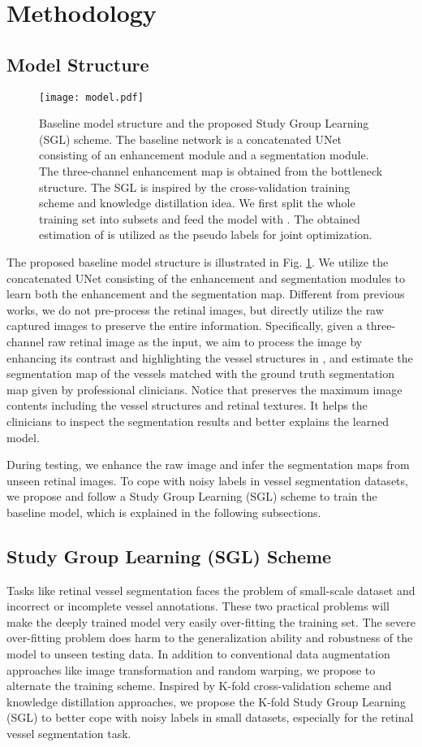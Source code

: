 \documentclass[runningheads]{llncs}
\begin{document}
\section{Methodology}
\subsection{Model Structure}
\begin{figure}[t]\centering
\texttt{[image: model.pdf]}
\caption{Baseline model structure and the proposed Study Group Learning (SGL) scheme. The baseline network is a concatenated UNet consisting of an enhancement module and a segmentation module. The three-channel enhancement map  is obtained from the bottleneck structure. The SGL is inspired by the cross-validation training scheme and knowledge distillation idea. We first split the whole training set  into  subsets  and feed the model  with . The obtained estimation  of  is utilized as the pseudo labels for joint optimization.}
\label{fig:model}
\end{figure}
The proposed baseline model structure is illustrated in Fig. \ref{fig:model}. We utilize the concatenated UNet consisting of the enhancement and segmentation modules to learn both the enhancement and the segmentation map. Different from previous works, we do not pre-process the retinal images, but directly utilize the raw captured images to preserve the entire information. Specifically, given a three-channel raw retinal image  as the input, we aim to process the image by enhancing its contrast and highlighting the vessel structures in , and estimate the segmentation map  of the vessels matched with the ground truth segmentation map  given by professional clinicians. Notice that  preserves the maximum image contents including the vessel structures and retinal textures. It helps the clinicians to inspect the segmentation results  and better explains the learned model. 

During testing, we enhance the raw image and infer the segmentation maps from unseen retinal images. To cope with noisy labels in vessel segmentation datasets, we propose and follow a Study Group Learning (SGL) scheme to train the baseline model, which is explained in the following subsections. 

\subsection{Study Group Learning (SGL) Scheme}
Tasks like retinal vessel segmentation faces the problem of small-scale dataset and incorrect or incomplete vessel annotations. These two practical problems will make the deeply trained model very easily over-fitting the training set. The severe over-fitting problem does harm to the generalization ability and robustness of the model to unseen testing data. In addition to conventional data augmentation approaches like image transformation and random warping, we propose to alternate the training scheme. Inspired by K-fold cross-validation scheme and knowledge distillation \cite{hinton2015distilling} approaches, we propose the K-fold Study Group Learning (SGL) to better cope with noisy labels in small datasets, especially for the retinal vessel segmentation task.
\end{document}
